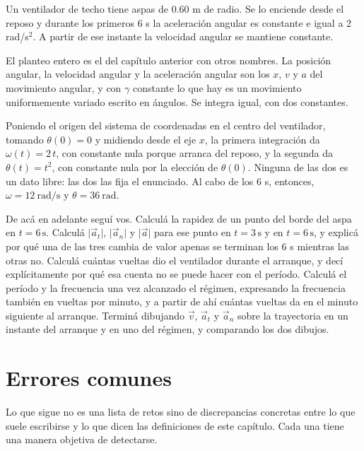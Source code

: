 \documentclass[11pt,openany]{book}
\begin{document}
\begin{ejemplo}[parcial]
Un ventilador de techo tiene aspas de 0.60 m de radio. Se lo enciende desde el reposo y durante los primeros 6 s la aceleración angular es constante e igual a 2 rad/s$^2$. A partir de ese instante la velocidad angular se mantiene constante.

El planteo entero es el del capítulo anterior con otros nombres. La posición angular, la velocidad angular y la aceleración angular son los $x$, $v$ y $a$ del movimiento angular, y con $\gamma$ constante lo que hay es un movimiento uniformemente variado escrito en ángulos. Se integra igual, con dos constantes.

Poniendo el origen del sistema de coordenadas en el centro del ventilador, tomando $\theta(0) = 0$ y midiendo desde el eje $x$, la primera integración da $\omega(t) = 2\,t$, con constante nula porque arranca del reposo, y la segunda da $\theta(t) = t^2$, con constante nula por la elección de $\theta(0)$. Ninguna de las dos es un dato libre: las dos las fija el enunciado. Al cabo de los 6 s, entonces, $\omega = 12\ \mathrm{rad/s}$ y $\theta = 36\ \mathrm{rad}$.

De acá en adelante seguí vos. Calculá la rapidez de un punto del borde del aspa en $t = 6\,\mathrm{s}$. Calculá $\lvert\vec a_t\rvert$, $\lvert\vec a_n\rvert$ y $\lvert\vec a\rvert$ para ese punto en $t = 3\,\mathrm{s}$ y en $t = 6\,\mathrm{s}$, y explicá por qué una de las tres cambia de valor apenas se terminan los 6 s mientras las otras no. Calculá cuántas vueltas dio el ventilador durante el arranque, y decí explícitamente por qué esa cuenta no se puede hacer con el período. Calculá el período y la frecuencia una vez alcanzado el régimen, expresando la frecuencia también en vueltas por minuto, y a partir de ahí cuántas vueltas da en el minuto siguiente al arranque. Terminá dibujando $\vec v$, $\vec a_t$ y $\vec a_n$ sobre la trayectoria en un instante del arranque y en uno del régimen, y comparando los dos dibujos.
\end{ejemplo}

\section{Errores comunes}

Lo que sigue no es una lista de retos sino de discrepancias concretas entre lo que suele escribirse y lo que dicen las definiciones de este capítulo. Cada una tiene una manera objetiva de detectarse.
\end{document}
